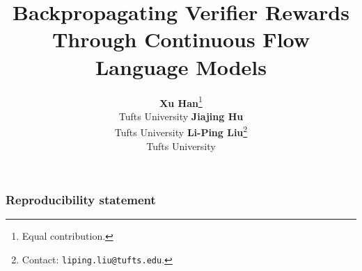 \documentclass{article}
\title{Backpropagating Verifier Rewards Through Continuous Flow Language Models}
\author{
\textbf{Xu Han}\thanks{Equal contribution.}\\
\normalfont Tufts University
\And
\textbf{Jiajing Hu}\footnotemark[1]\\
\normalfont Tufts University
\And
\textbf{Li-Ping Liu}\thanks{Contact: \texttt{liping.liu@tufts.edu}.}\\
\normalfont Tufts University
}
\begin{document}
\maketitle
{}











\subsubsection*{Reproducibility statement}





\appendix
\raggedbottom %






\end{document}
